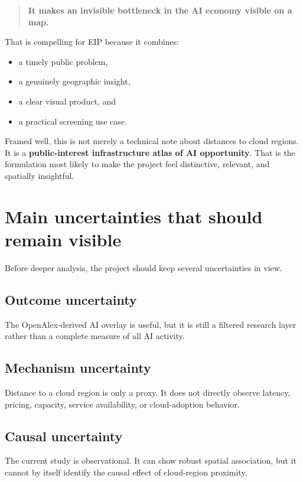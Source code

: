 \documentclass[11pt]{article}
\begin{document}
\begin{quote}
\textbf{It makes an invisible bottleneck in the AI economy visible on a map.}
\end{quote}

That is compelling for EIP because it combines:

\begin{itemize}[leftmargin=*]
  \item a timely public problem,
  \item a genuinely geographic insight,
  \item a clear visual product, and
  \item a practical screening use case.
\end{itemize}

Framed well, this is not merely a technical note about distances to cloud regions. It is a \textbf{public-interest infrastructure atlas of AI opportunity}. That is the formulation most likely to make the project feel distinctive, relevant, and spatially insightful.

\section{Main uncertainties that should remain visible}

Before deeper analysis, the project should keep several uncertainties in view.

\subsection{Outcome uncertainty}

The OpenAlex-derived AI overlay is useful, but it is still a filtered research layer rather than a complete measure of all AI activity.

\subsection{Mechanism uncertainty}

Distance to a cloud region is only a proxy. It does not directly observe latency, pricing, capacity, service availability, or cloud-adoption behavior.

\subsection{Causal uncertainty}

The current study is observational. It can show robust spatial association, but it cannot by itself identify the causal effect of cloud-region proximity.
\end{document}
